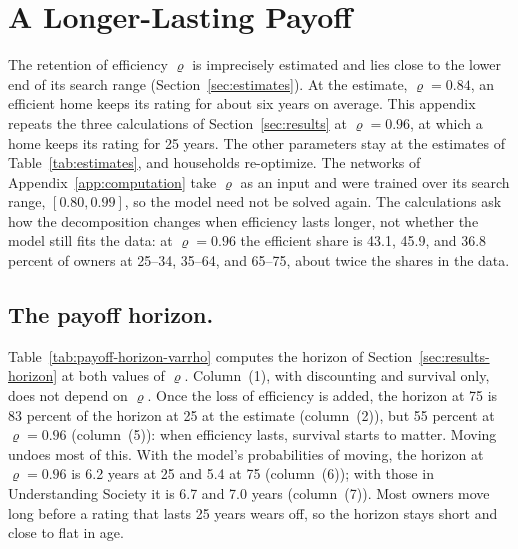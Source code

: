 \section{A Longer-Lasting Payoff}\label{app:varrho}

The retention of efficiency $\varrho$ is imprecisely estimated and lies close
to the lower end of its search range (Section~\ref{sec:estimates}). At the
estimate, $\varrho=0.84$, an efficient home keeps its rating for about six
years on average. This appendix repeats the three calculations of
Section~\ref{sec:results} at $\varrho=0.96$, at which a home keeps its rating
for 25 years. The other parameters stay at the estimates of
Table~\ref{tab:estimates}, and households re-optimize. The networks of
Appendix~\ref{app:computation} take $\varrho$ as an input and were trained
over its search range, $[0.80,0.99]$, so the model need not be solved again.
The calculations ask how the decomposition changes when efficiency lasts
longer, not whether the model still fits the data: at $\varrho=0.96$ the
efficient share is 43.1, 45.9, and 36.8 percent of owners at 25--34, 35--64,
and 65--75, about twice the shares in the data.

\subsection{The payoff horizon.}\label{app:varrho-horizon}
Table~\ref{tab:payoff-horizon-varrho} computes the horizon of
Section~\ref{sec:results-horizon} at both values of $\varrho$. Column~(1),
with discounting and survival only, does not depend on $\varrho$. Once the
loss of efficiency is added, the horizon at 75 is 83 percent of the horizon
at 25 at the estimate (column~(2)), but 55 percent at $\varrho=0.96$
(column~(5)): when efficiency lasts, survival starts to matter. Moving undoes
most of this. With the model's probabilities of moving, the horizon at
$\varrho=0.96$ is 6.2 years at 25 and 5.4 at 75 (column~(6)); with those in
Understanding Society it is 6.7 and 7.0 years (column~(7)). Most owners move
long before a rating that lasts 25 years wears off, so the horizon stays
short and close to flat in age.

